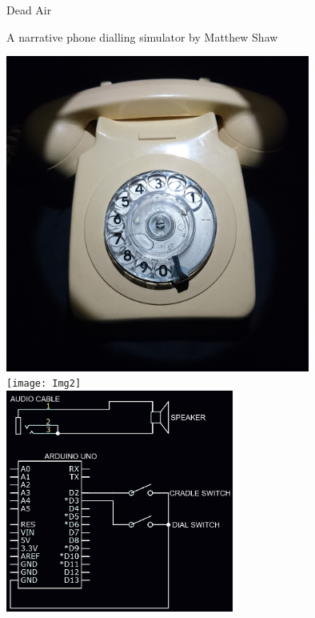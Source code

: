 \documentclass{article}
\begin{document}
\begin{center} %
    \begin{Huge}
        Dead Air\\
    \end{Huge}    
    A narrative phone dialling simulator by Matthew Shaw
\end{center}


\begin{multicols}{2}
    
    \begin{center}
        \includegraphics[width=10cm]{Img1}\\
        \texttt{[image: Img2]}\\
        \includegraphics[width=7.5cm]{CircuitDiagramDark}\\
    \end{center}

\end{multicols}
\end{document}
